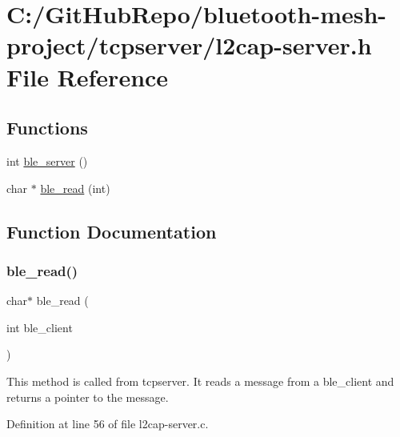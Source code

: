 \hypertarget{l2cap-server_8h}{}\section{C\+:/\+Git\+Hub\+Repo/bluetooth-\/mesh-\/project/tcpserver/l2cap-\/server.h File Reference}
\label{l2cap-server_8h}
\subsection*{Functions}
\begin{DoxyCompactItemize}
\item 
int \mbox{\hyperlink{l2cap-server_8h_ad0f02beb64dd67c688103f2ebe24425c}{ble\+\_\+server}} ()
\item 
char $\ast$ \mbox{\hyperlink{l2cap-server_8h_a7d0e79796199af82d71dedbec03f1b4d}{ble\+\_\+read}} (int)
\end{DoxyCompactItemize}


\subsection{Function Documentation}
\mbox{\label{l2cap-server_8h_a7d0e79796199af82d71dedbec03f1b4d}} 
\subsubsection{\texorpdfstring{ble\+\_\+read()}{ble\_read()}}
{\footnotesize\ttfamily char$\ast$ ble\+\_\+read (\begin{DoxyParamCaption}\item[{int}]{ble\+\_\+client }\end{DoxyParamCaption})}

This method is called from tcpserver. It reads a message from a ble\+\_\+client and returns a pointer to the message. 

Definition at line 56 of file l2cap-\/server.\+c.

\mbox{\label{l2cap-server_8h_ad0f02beb64dd67c688103f2ebe24425c}} 
